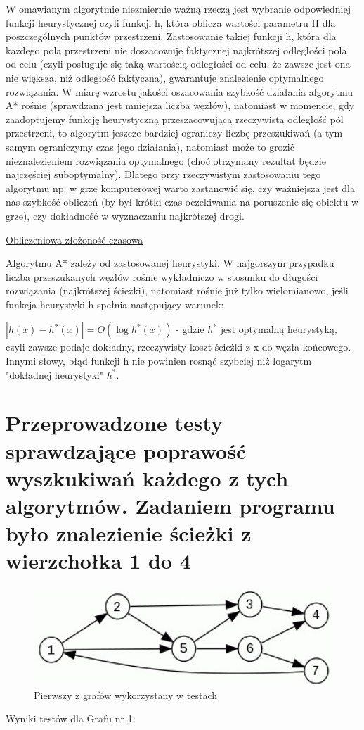 \documentclass[11pt]{article}
\begin{document}
W omawianym algorytmie niezmiernie ważną rzeczą jest wybranie odpowiedniej funkcji heurystycznej  czyli funkcji h, która oblicza wartości parametru H dla poszczególnych punktów przestrzeni. Zastosowanie takiej funkcji h, która dla każdego pola przestrzeni nie doszacowuje faktycznej najkrótszej odległości pola od celu (czyli posługuje się taką wartością odległości od celu, że zawsze jest ona nie większa, niż odległość faktyczna), gwarantuje znalezienie optymalnego rozwiązania. W miarę wzrostu jakości oszacowania szybkość działania algorytmu A* rośnie (sprawdzana jest mniejsza liczba węzłów), natomiast w momencie, gdy zaadoptujemy funkcję heurystyczną przeszacowującą rzeczywistą odległość pól przestrzeni, to algorytm jeszcze bardziej ograniczy liczbę przeszukiwań (a tym samym ograniczymy czas jego działania), natomiast może to grozić nieznalezieniem rozwiązania optymalnego (choć otrzymany rezultat będzie najczęściej suboptymalny). Dlatego przy rzeczywistym zastosowaniu tego algorytmu np. w grze komputerowej warto zastanowić się, czy ważniejsza jest dla nas szybkość obliczeń (by był krótki czas oczekiwania na poruszenie się obiektu w grze), czy dokładność w wyznaczaniu najkrótszej drogi. 

\underline{Obliczeniowa złożoność czasowa}

Algorytmu A* zależy od zastosowanej heurystyki. W najgorszym przypadku liczba przeszukanych węzłów rośnie wykładniczo w stosunku do długości rozwiązania (najkrótszej ścieżki), natomiast rośnie już tylko wielomianowo, jeśli funkcja heurystyki h spełnia następujący warunek:

  \begin{math}  |h(x) - h^*(x)| = O(\log h^*(x))
  \end{math}
 - gdzie $h^*$ jest optymalną heurystyką, czyli zawsze podaje dokładny, rzeczywisty koszt ścieżki z x do węzła końcowego. Innymi słowy, błąd funkcji h nie powinien rosnąć szybciej niż logarytm "dokładnej heurystyki" $h^*$.
 \newpage
 \section{Przeprowadzone testy sprawdzające poprawość wyszkukiwań każdego z tych algorytmów.
 Zadaniem programu było znalezienie ścieżki z wierzchołka 1 do 4}

  \begin{figure}[ht!] 
\centering
 \includegraphics[width=120mm]{graphchart1}
 \caption{Pierwszy z grafów wykorzystany w testach} 
\label{overflow}
 \end{figure}
 Wyniki testów dla Grafu nr 1:
 
\end{document}

